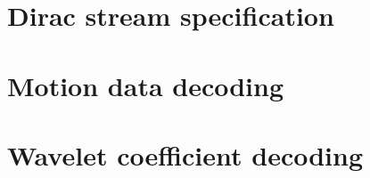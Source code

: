 


\section{Dirac stream specification}

\clearpage
\section{Motion data decoding}

\clearpage
\section{Wavelet coefficient decoding}

